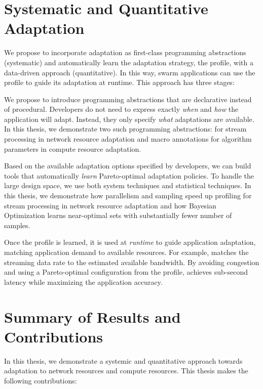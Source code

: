 \documentclass[thesis.tex]{subfiles}
\begin{document}
\section{Systematic and Quantitative Adaptation}
\label{sec:adaptation}

We propose to incorporate adaptation as first-class programming abstractions
(systematic) and automatically learn the adaptation strategy, the profile, with
a data-driven approach (quantitative). In this way, swarm applications can use
the profile to guide its adaptation at runtime. This approach has three stages:

 We propose to introduce programming
abstractions that are declarative instead of procedural. Developers do not need
to express exactly \emph{when} and \emph{how} the application will
adapt. Instead, they only specify \emph{what} adaptations are available. In this
thesis, we demonstrate two such programming abstractions: \maybe{} for stream
processing in network resource adaptation and macro annotations for algorithm
parameters in compute resource adaptation.

 Based on the available adaptation
options specified by developers, we can build tools that automatically
\emph{learn} Pareto-optimal adaptation policies. To handle the large design
space, we use both system techniques and statistical techniques. In this thesis,
we demonstrate how parallelism and sampling speed up profiling for stream
processing in network resource adaptation and how Bayesian Optimization learns
near-optimal sets with substantially fewer number of samples.

 Once the profile is learned, it is used at
\emph{runtime} to guide application adaptation, matching application demand to
available resources. For example, \awstream{} matches the streaming data rate to
the estimated available bandwidth. By avoiding congestion and using a
Pareto-optimal configuration from the profile, \awstream{} achieves sub-second
latency while maximizing the application accuracy.

\section{Summary of Results and Contributions}
\label{sec:contributions}

In this thesis, we demonstrate a systemic and quantitative approach towards
adaptation to network resources and compute resources. This thesis makes the
following contributions:
\end{document}
